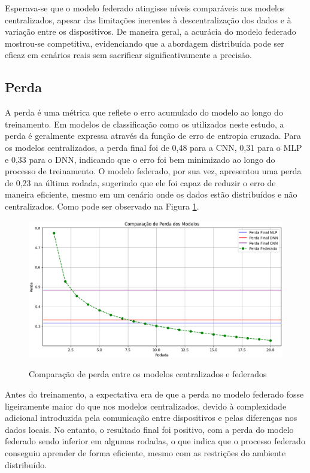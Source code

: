 Esperava-se que o modelo federado atingisse níveis comparáveis aos modelos centralizados, apesar das limitações inerentes à descentralização dos dados e à variação entre os dispositivos. De maneira geral, a acurácia do modelo federado mostrou-se competitiva, evidenciando que a abordagem distribuída pode ser eficaz em cenários reais sem sacrificar significativamente a precisão.

\subsection{Perda}

A perda é uma métrica que reflete o erro acumulado do modelo ao longo do treinamento. Em modelos de classificação como os utilizados neste estudo, a perda é geralmente expressa através da função de erro de entropia cruzada. Para os modelos centralizados, a perda final foi de 0,48 para a CNN, 0,31 para o MLP e 0,33 para o DNN, indicando que o erro foi bem minimizado ao longo do processo de treinamento. O modelo federado, por sua vez, apresentou uma perda de 0,23 na última rodada, sugerindo que ele foi capaz de reduzir o erro de maneira eficiente, mesmo em um cenário onde os dados estão distribuídos e não centralizados. Como pode ser observado na Figura \ref{fig:lossComparison}.

\begin{figure}[ht]
    \centering
    \caption{Comparação de perda entre os modelos centralizados e federados}
    \includegraphics[scale=0.4]{figuras/analiseResultados/lossComparison.eps}
    \label{fig:lossComparison}
\end{figure}

Antes do treinamento, a expectativa era de que a perda no modelo federado fosse ligeiramente maior do que nos modelos centralizados, devido à complexidade adicional introduzida pela comunicação entre dispositivos e pelas diferenças nos dados locais. No entanto, o resultado final foi positivo, com a perda do modelo federado sendo inferior em algumas rodadas, o que indica que o processo federado conseguiu aprender de forma eficiente, mesmo com as restrições do ambiente distribuído.


